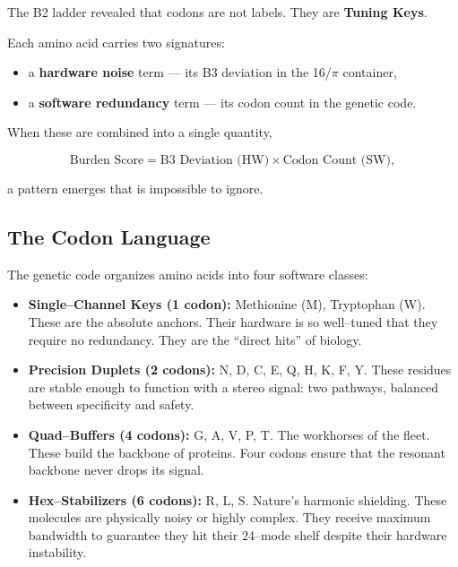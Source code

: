 \documentclass[11pt, letterpaper, openany]{book}
\begin{document}
The B2 ladder revealed that codons are not labels.  
They are \textbf{Tuning Keys}.

Each amino acid carries two signatures:

\begin{itemize}
    \item a \textbf{hardware noise} term — its B3 deviation in the 16/$\pi$ container,
    \item a \textbf{software redundancy} term — its codon count in the genetic code.
\end{itemize}

When these are combined into a single quantity,



\[
\text{Burden Score} = \text{B3 Deviation (HW)} \times \text{Codon Count (SW)},
\]



a pattern emerges that is impossible to ignore.

\subsection*{The Codon Language}

The genetic code organizes amino acids into four software classes:

\begin{itemize}
    \item \textbf{Single–Channel Keys (1 codon):}  
    Methionine (M), Tryptophan (W).  
    These are the absolute anchors. Their hardware is so well–tuned that they
    require no redundancy. They are the “direct hits” of biology.

    \item \textbf{Precision Duplets (2 codons):}  
    N, D, C, E, Q, H, K, F, Y.  
    These residues are stable enough to function with a stereo signal: two
    pathways, balanced between specificity and safety.

    \item \textbf{Quad–Buffers (4 codons):}  
    G, A, V, P, T.  
    The workhorses of the fleet. These build the backbone of proteins. Four
    codons ensure that the resonant backbone never drops its signal.

    \item \textbf{Hex–Stabilizers (6 codons):}  
    R, L, S.  
    Nature’s harmonic shielding. These molecules are physically noisy or highly
    complex. They receive maximum bandwidth to guarantee they hit their 24–mode
    shelf despite their hardware instability.
\end{itemize}
\end{document}
